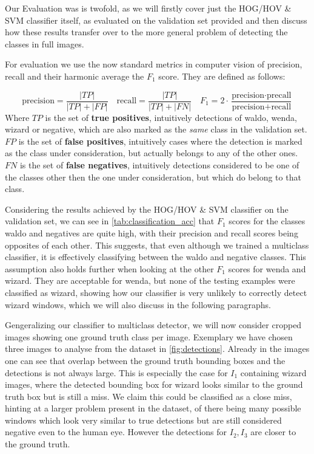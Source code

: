 \documentclass[11pt]{article}
\begin{document}
Our Evaluation was is twofold, as we will firstly cover just the HOG/HOV \& SVM classifier itself, as evaluated on the 
validation set provided and then discuss how these results transfer over to the more general problem of detecting the classes in
full images.

For evaluation we use the now standard metrics in computer vision of precision, recall and their harmonic average the \( F_1 \) score.
They are defined as follows:

\begin{equation*}
    \text{precision} = \frac{|TP|}{|TP| + |FP|}  
    \quad
    \text{recall} = \frac{|TP|}{|TP| + |FN|}
    \quad
    F_1 = 2\cdot \frac{\text{precision} \cdot \text{precall}}{\text{precision} + \text{recall}}
\end{equation*}
Where \( TP \) is the set of \textbf{true positives}, intuitively detections of waldo, wenda, wizard or negative, which are also marked 
as the \textit{same} class in the validation set. 
\( FP \) is the set of \textbf{false positives}, intuitively cases where the detection is marked as the class under consideration, but actually belongs to any of the other ones.
\( FN \) is the set of \textbf{false negatives}, intuitively detections considered to be one of the classes other then the one under consideration, but which do belong to that class.

Considering the results achieved by the HOG/HOV \& SVM classifier on the validation set, 
we can see in \autoref{tab:classification_acc} that \( F_1 \) scores for the classes waldo and negatives are quite high, with
their precision and recall scores being opposites of each other. This suggests, that even although we trained a multiclass classifier, 
it is effectively classifying between the waldo and negative classes. This assumption also holds further when looking at the other
\( F_1 \) scores for wenda and wizard. They are acceptable for wenda, but none of the testing examples were classified as wizard, 
showing how our classifier is very unlikely to correctly detect wizard windows, which we will also discuss in the following paragraphs.

Gengeralizing our classifier to multiclass detector, we will now consider cropped images showing one ground truth class per image. 
Exemplary we have chosen three images to analyse from the dataset in \autoref{fig:detections}.
Already in the images one can see that overlap between the ground truth bounding boxes and the detections is not always large.
This is especially the case for \( I_1 \) containing wizard images, where the detected bounding box for wizard looks similar to the
ground truth box but is still a miss. We claim this could be classified as a close miss, hinting at a larger problem present in the dataset, 
of there being many possible windows which look very similar to true detections but are still considered negative even to the human eye. 
However the detections for \( I_2, I_3 \) are closer to the ground truth.
\end{document}
